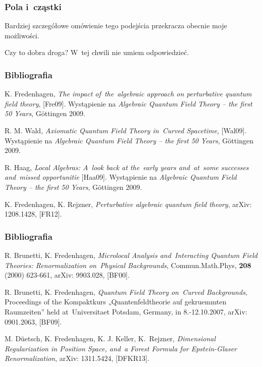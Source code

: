 \documentclass[10pt,t]{beamer}
\begin{document}
\begin{frame}
  \frametitle{Pola i~cząstki}


  Bardziej szczegółowe omówienie tego podejścia przekracza obecnie
  moje możliwości.

  Czy to dobra droga? W~tej chwili nie umiem odpowiedzieć.

\end{frame}










\begin{frame}
  \frametitle{Bibliografia}


  K. Fredenhagen, \textit{The impact of~the~algebraic approach on
    perturbative quantum field theory}, [Fre09]. Wystąpienie na
  \textit{Algebraic Quantum Field Theory – the first 50 Years},
  G\"{o}ttingen 2009.

  R. M. Wald, \textit{Axiomatic Quantum Field Theory in~Curved
    Spacetime}, [Wal09]. Wystąpienie na \textit{Algebraic Quantum
    Field Theory – the first 50 Years}, G\"{o}ttingen 2009.

  R. Haag, \textit{Local Algebras: A~look back at the~early years
    and~at~some successes and~missed opportunitie} [Haa09].
  Wystąpienie na \textit{Algebraic Quantum Field Theory – the first 50
    Years}, G\"{o}ttingen 2009.

  K. Fredenhagen, K. Rejzner, \textit{Perturbative algebraic quantum
    field theory}, arXiv: 1208.1428, [FR12].

\end{frame}





\begin{frame}
  \frametitle{Bibliografia}


  R. Brunetti, K. Fredenhagen, \textit{Microlocal Analysis
    and~Interacting Quantum Field Theories: Renormalization
    on~Physical Backgrounds}, Commun.Math.Phys, \textbf{208} (2000)
  623-661, arXiv: 9903.028, [BF00].

  R. Brunetti, K. Fredenhagen, \textit{Quantum Field Theory on~Curved
    Backgrounds}, Proceedings of the Kompaktkurs „Quantenfeldtheorie
  auf gekruemmten Raumzeiten” held at~Universitaet Potsdam, Germany,
  in 8.-12.10.2007, arXiv: 0901.2063, [BF09].

  M. D\"{u}etsch, K. Fredenhagen, K. J. Keller, K.~Rejzner,
  \textit{Dimensional Regularization in Position Space, and~a Forest
    Formula for Epstein-Glaser Renormalization}, arXiv: 1311.5424,
  [DFKR13].

\end{frame}
\end{document}

